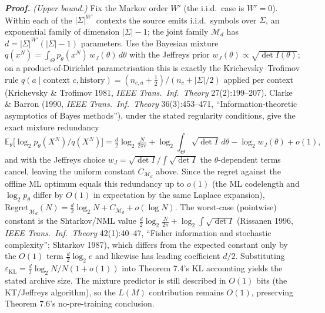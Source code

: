 \documentclass[
]{article}
\begin{document}
\emph{\textbf{Proof.}}
\emph{(Upper bound.)} Fix the Markov order $W'$ (the i.i.d.\ case is
$W'=0$). Within each of the $|\Sigma|^{W'}$ contexts the source emits
i.i.d.\ symbols over $\Sigma$, an exponential family of dimension
$|\Sigma|-1$; the joint family $\mathcal{M}_d$ has
$d = |\Sigma|^{W'}(|\Sigma|-1)$ parameters. Use the Bayesian mixture
$q(x^N) = \int_\Theta p_\theta(x^N)\,w_J(\theta)\,d\theta$ with the
Jeffreys prior $w_J(\theta) \propto \sqrt{\det I(\theta)}$; on a
product-of-Dirichlet parametrisation this is exactly the
Krichevsky--Trofimov rule
$q(a\mid\text{context }c,\text{history}) = (n_{c,a}+\tfrac12)/(n_c + |\Sigma|/2)$
applied per context (Krichevsky \& Trofimov 1981, \emph{IEEE
Trans.\ Inf.\ Theory} 27(2):199--207). Clarke \& Barron (1990,
\emph{IEEE Trans.\ Inf.\ Theory} 36(3):453--471, ``Information-theoretic
asymptotics of Bayes methods''), under the stated regularity
conditions, give the exact mixture redundancy
\[
\mathbb{E}_\theta\!\bigl[\log_2 p_\theta(X^N)/q(X^N)\bigr]
= \tfrac{d}{2}\log_2\tfrac{N}{2\pi e}
+ \log_2\!\!\int_\Theta\!\!\sqrt{\det I}\,d\theta
- \log_2 w_J(\theta) + o(1),
\]
and with the Jeffreys choice $w_J = \sqrt{\det I}/\!\int\!\sqrt{\det I}$
the $\theta$-dependent terms cancel, leaving the uniform constant
$C_{\mathcal{M}_d}$ above. Since the regret against the offline ML
optimum equals this redundancy up to $o(1)$ (the ML codelength and
$\log_2 p_\theta$ differ by $O(1)$ in expectation by the same
Laplace expansion), $\mathrm{Regret}_{\mathcal{M}_d}(N) =
\tfrac{d}{2}\log_2 N + C_{\mathcal{M}_d} + o(\log N)$. The
worst-case (pointwise) constant is the Shtarkov/NML value
$\tfrac{d}{2}\log_2\tfrac{N}{2\pi} + \log_2\!\int\!\sqrt{\det I}$
(Rissanen 1996, \emph{IEEE Trans.\ Inf.\ Theory} 42(1):40--47,
``Fisher information and stochastic complexity''; Shtarkov 1987),
which differs from the expected constant only by the $O(1)$ term
$\tfrac{d}{2}\log_2 e$ and likewise has leading coefficient $d/2$.
Substituting $\varepsilon_{\mathrm{KL}} = \tfrac{d}{2}\log_2 N / N
(1+o(1))$ into Theorem 7.4's KL accounting yields the stated archive
size. The mixture predictor is still described in $O(1)$ bits (the
KT/Jeffreys algorithm), so the $L(M)$ contribution remains $O(1)$,
preserving Theorem 7.6's no-pre-training conclusion.
\end{document}
